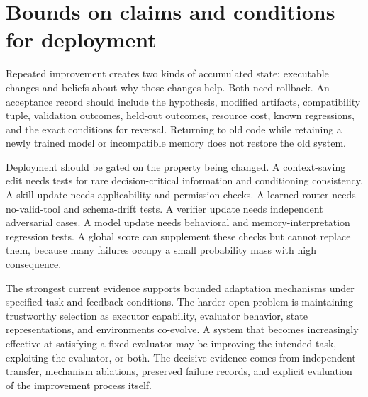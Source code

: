 \section{Bounds on claims and conditions for deployment}\label{sec:C30:07}
Repeated improvement creates two kinds of accumulated state: executable changes and beliefs about why those changes help. Both need rollback. An acceptance record should include the hypothesis, modified artifacts, compatibility tuple, validation outcomes, held-out outcomes, resource cost, known regressions, and the exact conditions for reversal. Returning to old code while retaining a newly trained model or incompatible memory does not restore the old system.

Deployment should be gated on the property being changed. A context-saving edit needs tests for rare decision-critical information and conditioning consistency. A skill update needs applicability and permission checks. A learned router needs no-valid-tool and schema-drift tests. A verifier update needs independent adversarial cases. A model update needs behavioral and memory-interpretation regression tests. A global score can supplement these checks but cannot replace them, because many failures occupy a small probability mass with high consequence.

The strongest current evidence supports bounded adaptation mechanisms under specified task and feedback conditions. The harder open problem is maintaining trustworthy selection as executor capability, evaluator behavior, state representations, and environments co-evolve. A system that becomes increasingly effective at satisfying a fixed evaluator may be improving the intended task, exploiting the evaluator, or both. The decisive evidence comes from independent transfer, mechanism ablations, preserved failure records, and explicit evaluation of the improvement process itself.
